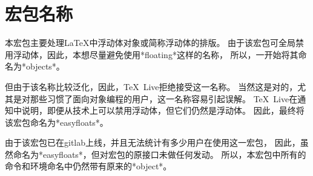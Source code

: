 
\section{宏包名称}
\label{names}

本宏包主要处理\LaTeX{}中浮动体对象或简称浮动体的排版。
由于该宏包可全局禁用浮动体，因此，本想尽量避免使用*floating*这样的名称，
所以，一开始将其命名为*objects*。

但由于该名称比较泛化，因此，\TeX\ Live拒绝接受这一名称。
当然这是对的，尤其是对那些习惯了面向对象编程的用户，这一名称容易引起误解。
\TeX\ Live在通知中说明，即便从技术上可以禁用浮动体，但它们仍然是浮动体。
因此，最终将该宏包命名为*easyfloats*。

由于该宏包已在gitlab上线，并且无法统计有多少用户在使用这一宏包，
因此，虽然命名为*easyfloats*，但对宏包的原接口未做任何发动。
所以，本宏包中所有的命令和环境命名中仍然带有原来的*object*。

